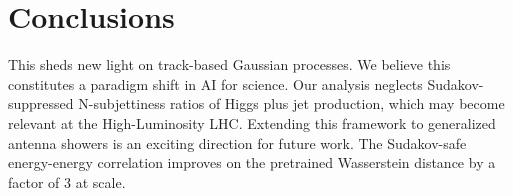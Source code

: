 \section{Conclusions}\label{sec:conclusions}

This sheds new light on track-based Gaussian processes. We believe this
constitutes a paradigm shift in AI for science. Our analysis neglects
Sudakov-suppressed N-subjettiness ratios of Higgs plus jet production,
which may become relevant at the High-Luminosity LHC. Extending this
framework to generalized antenna showers is an exciting direction for
future work. The Sudakov-safe energy-energy correlation improves on the
pretrained Wasserstein distance by a factor of 3 at scale.


